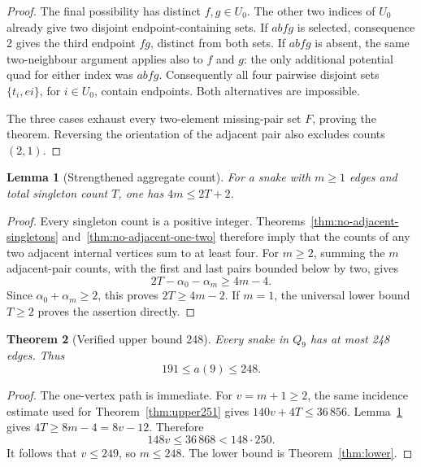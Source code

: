 \documentclass[11pt,a4paper]{article}
\newtheorem{theorem}{Theorem}[section]
\newtheorem{lemma}[theorem]{Lemma}
\theoremstyle{definition}
\theoremstyle{remark}
\newcommand{\Q}{Q}
\begin{document}
\begin{proof}
The final possibility has distinct $f,g\in U_0$. The other two indices of $U_0$ already give two disjoint endpoint-containing sets. If $abfg$ is selected, consequence 2 gives the third endpoint $fg$, distinct from both sets. If $abfg$ is absent, the same two-neighbour argument applies also to $f$ and $g$: the only additional potential quad for either index was $abfg$. Consequently all four pairwise disjoint sets $\{t_i,ei\}$, for $i\in U_0$, contain endpoints. Both alternatives are impossible.

The three cases exhaust every two-element missing-pair set $F$, proving the theorem. Reversing the orientation of the adjacent pair also excludes counts $(2,1)$.
\end{proof}

\begin{lemma}[Strengthened aggregate count]\label{lem:aggregate-four}
For a snake with $m\ge1$ edges and total singleton count $T$, one has $4m\le2T+2$.
\end{lemma}
\begin{proof}
Every singleton count is a positive integer. Theorems~\ref{thm:no-adjacent-singletons} and~\ref{thm:no-adjacent-one-two} therefore imply that the counts of any two adjacent internal vertices sum to at least four. For $m\ge2$, summing the $m$ adjacent-pair counts, with the first and last pairs bounded below by two, gives
\[
2T-\alpha_0-\alpha_m\ge4m-4.
\]
Since $\alpha_0+\alpha_m\ge2$, this proves $2T\ge4m-2$. If $m=1$, the universal lower bound $T\ge2$ proves the assertion directly.
\end{proof}

\begin{theorem}[Verified upper bound 248]\label{thm:upper248}
Every snake in $\Q_9$ has at most 248 edges. Thus
\[
\boxed{191\le a(9)\le248.}
\]
\end{theorem}
\begin{proof}
The one-vertex path is immediate. For $v=m+1\ge2$, the same incidence estimate used for Theorem~\ref{thm:upper251} gives $140v+4T\le36\,856$. Lemma~\ref{lem:aggregate-four} gives $4T\ge8m-4=8v-12$. Therefore
\[
148v\le36\,868<148\cdot250.
\]
It follows that $v\le249$, so $m\le248$. The lower bound is Theorem~\ref{thm:lower}.
\end{proof}
\end{document}
